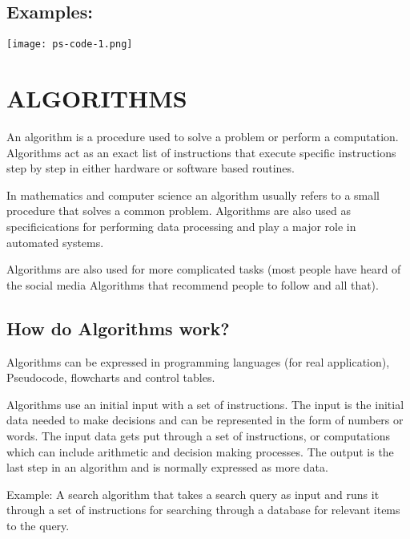 \documentclass[a4paper]{article}
\begin{document}
\subsection{Examples:}
\texttt{[image: ps-code-1.png]}


\clearpage

\section{ALGORITHMS}
An algorithm is a procedure used to solve a problem or perform a computation. Algorithms act as an exact list of instructions that execute specific instructions step by step in either hardware or software based routines. \par
\vspace{0.5cm}
In mathematics and computer science an algorithm usually refers to a small procedure that solves a common problem. Algorithms are also used as specificications for performing data processing and play a major role in automated systems. \par 
\vspace{0.5cm}
Algorithms are also used for more complicated tasks (most people have heard of the social media Algorithms that recommend people to follow and all that).

\subsection{How do Algorithms work?}
Algorithms can be expressed in programming languages (for real application), Pseudocode, flowcharts and control tables. \par 
\vspace{0.5cm}
Algorithms use an initial input with a set of instructions. The input is the initial data needed to make decisions and can be represented in the form of numbers or words. The input data gets put through a set of instructions, or computations which can include arithmetic and decision making processes. The output is the last step in an algorithm and is normally expressed as more data. \par 
\vspace{0.5cm} 
Example:
\vspace{0.5cm}
A search algorithm that takes a search query as input and runs it through a set of instructions for searching through a database for relevant items to the query.
\end{document}
